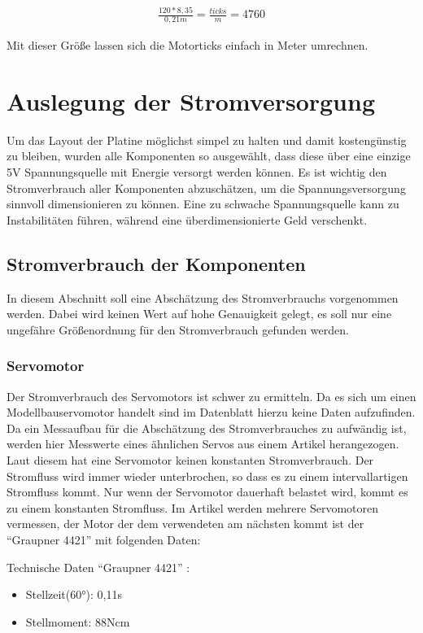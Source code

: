 \begin{align}
\frac{120*8,35}{0,21m}=\frac{ticks}{m}=4760
\end{align}

Mit dieser Größe lassen sich die Motorticks einfach in Meter umrechnen. 

\section{Auslegung der Stromversorgung}

Um das Layout der Platine möglichst simpel zu halten und damit kostengünstig zu bleiben, wurden alle Komponenten so ausgewählt, dass diese über eine einzige 5V Spannungsquelle mit Energie versorgt werden können.
Es ist wichtig den Stromverbrauch aller Komponenten abzuschätzen, um die Spannungsversorgung sinnvoll dimensionieren zu kön\-nen. Eine zu schwache Spannungsquelle kann zu Instabilitäten führen,
während eine überdimensionierte Geld verschenkt.

\subsection{Stromverbrauch der Komponenten}
In diesem Abschnitt soll eine Abschätzung des Stromverbrauchs vorgenommen werden. Dabei wird keinen Wert auf hohe Genauigkeit gelegt, es soll nur eine ungefähre Größenordnung für den Stromverbrauch gefunden werden.

\subsubsection{Servomotor}
Der Stromverbrauch des Servomotors ist schwer zu ermitteln. Da es sich um einen Modellbauservomotor handelt 
sind im Datenblatt hierzu keine Daten aufzufinden. Da ein Messaufbau für die Abschätzung des Stromverbrauches
zu aufwändig ist, werden hier Messwerte eines ähnlichen Servos aus einem Artikel \cite{website-servo} herangezogen.
Laut diesem hat eine Servomotor keinen konstanten Stromverbrauch. Der Stromfluss wird immer wieder unterbrochen, so dass es zu einem intervallartigen Stromfluss kommt.
Nur wenn der Servomotor dauerhaft belastet wird, kommt es zu einem konstanten Stromfluss.
Im Artikel werden mehrere Servomotoren vermessen, der Motor der dem verwendeten am nächsten kommt ist der ``Graupner 4421'' mit folgenden Daten:


Technische Daten ``Graupner 4421'' \cite{website-servo-vergleich-dat}:
\begin{itemize}
 \item Stellzeit(60°): 0,11s
 \item Stellmoment: 88Ncm 
\end{itemize}


